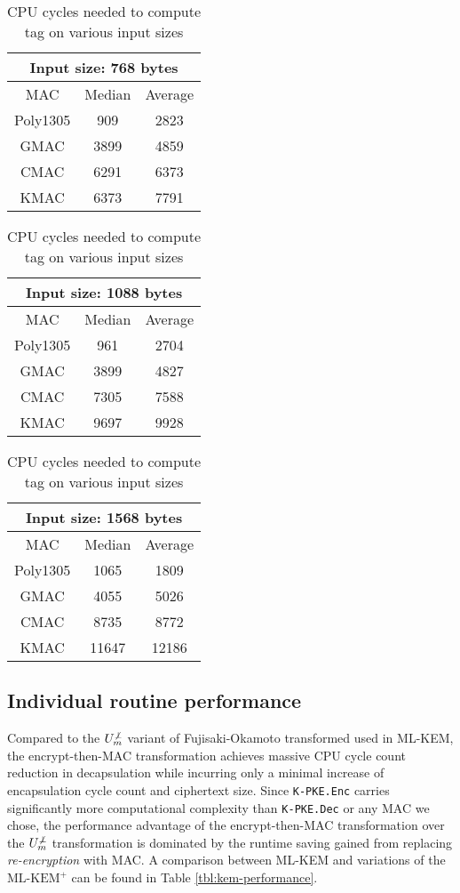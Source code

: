 \documentclass[journal=tches,submission]{iacrtrans}
\newcommand{\encrypt}{\texttt{Enc}}
\newcommand{\decrypt}{\texttt{Dec}}
\begin{document}
\begin{table}[H]
    \centering
    \footnotesize
    \caption{CPU cycles needed to compute tag on various input sizes}\label{tbl:mac-performance}
    \begin{tabular}{|c|c|c|}
        \hline
        \multicolumn{3}{|c|}{\bf Input size: 768 bytes} \\
        \hline
        MAC & Median & Average \\
        \hline
        Poly1305 & 909 & 2823 \\
        \hline
        GMAC & 3899 & 4859 \\
        \hline
        CMAC & 6291 & 6373 \\
        \hline
        KMAC & 6373 & 7791 \\
        \hline
    \end{tabular}
    \begin{tabular}{|c|c|c|}
        \hline
        \multicolumn{3}{|c|}{\bf Input size: 1088 bytes} \\
        \hline
        MAC & Median & Average \\
        \hline
        Poly1305 & 961 & 2704 \\
        \hline
        GMAC & 3899 & 4827 \\
        \hline
        CMAC & 7305 & 7588 \\
        \hline
        KMAC & 9697 & 9928 \\
        \hline
    \end{tabular}
    \begin{tabular}{|c|c|c|}
        \hline
        \multicolumn{3}{|c|}{\bf Input size: 1568 bytes} \\
        \hline
        MAC & Median & Average \\
        \hline
        Poly1305 & 1065 & 1809 \\
        \hline
        GMAC & 4055 & 5026 \\
        \hline
        CMAC & 8735 & 8772 \\
        \hline
        KMAC & 11647 & 12186 \\
        \hline
    \end{tabular}
\end{table}

\subsection{Individual routine performance}
Compared to the $U^{\not\bot}_m$ variant of Fujisaki-Okamoto transformed used in ML-KEM, the encrypt-then-MAC transformation achieves massive CPU cycle count reduction in decapsulation while incurring only a minimal increase of encapsulation cycle count and ciphertext size. Since \texttt{K-PKE.\encrypt} carries significantly more computational complexity than \texttt{K-PKE.\decrypt} or any MAC we chose, the performance advantage of the encrypt-then-MAC transformation over the $U^{\not\bot}_m$ transformation is dominated by the runtime saving gained from replacing \emph{re-encryption} with MAC. A comparison between ML-KEM and variations of the $\text{ML-KEM}^+$ can be found in Table \ref{tbl:kem-performance}.
\end{document}
